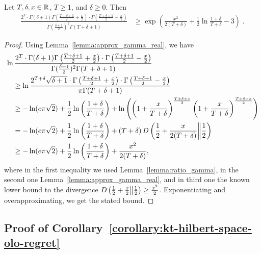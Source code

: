 \begin{lemma}
\label{lemma:lower_bound_gamma}
Let $T,\delta,x \in \mathbb{R}$, $T\geq1$, and $\delta\geq0$. Then
\begin{align*}
\frac{2^T \cdot \Gamma(\delta+1) \Gamma \left(\frac{T+\delta+1}{2} + \frac{x}{2} \right) \cdot \Gamma \left(\frac{T+\delta+1}{2} - \frac{x}{2} \right)}{ \Gamma(\frac{\delta+1}{2})^2 \Gamma(T+\delta+1)}
&\geq\exp\left(\frac{x^2}{2(T+\delta)} +\frac{1}{2} \ln \frac{1+\delta}{T+\delta} -3\right) \;.
\end{align*}
\end{lemma}
\begin{proof}
Using Lemma~\ref{lemma:approx_gamma_real}, we have
\begin{align*}
&\ln \frac{2^T \cdot \Gamma(\delta+1) \Gamma \left(\frac{T+\delta+1}{2} + \frac{x}{2} \right) \cdot \Gamma \left(\frac{T+\delta+1}{2} - \frac{x}{2} \right)}{ \Gamma(\frac{\delta+1}{2})^2 \Gamma(T+\delta+1)} \\
&\quad \geq \ln \frac{2^{T+\delta} \sqrt{\delta+1} \cdot \Gamma \left(\frac{T+\delta+1}{2} + \frac{x}{2} \right) \cdot \Gamma \left(\frac{T+\delta+1}{2} - \frac{x}{2} \right)}{ \pi \Gamma(T+\delta+1)} \\
&\quad \geq -\ln(e \pi \sqrt{2}) +\frac{1}{2} \ln\left(\frac{1+\delta}{T+\delta}\right) +\ln \left(\left( 1+\frac{x}{T+\delta} \right)^\frac{T+\delta+x}{2} \left( 1+\frac{x}{T+\delta} \right)^\frac{T+\delta-x}{2}\right) \\
&\quad = -\ln(e \pi \sqrt{2}) +\frac{1}{2} \ln\left(\frac{1+\delta}{T+\delta}\right)+ (T+\delta) \, D\left({\frac{1}{2}+\frac{x}{2(T+\delta)}}\middle\|{\frac{1}{2}}\right) \\
&\quad \geq -\ln(e \pi \sqrt{2}) +\frac{1}{2} \ln\left(\frac{1+\delta}{T+\delta}\right)+ \frac{x^2}{2(T+\delta)} ,
\end{align*}
where in the first inequality we used Lemma~\ref{lemma:ratio_gamma}, in the second one Lemma~\ref{lemma:approx_gamma_real}, and in third one the known lower bound to the divergence $D\left({\frac{1}{2}+\frac{x}{2}}\middle\|{\frac{1}{2}}\right) \geq \frac{x^2}{2}$. Exponentiating and overapproximating, we get the stated bound.
\end{proof}


\subsection{Proof of Corollary~\ref{corollary:kt-hilbert-space-olo-regret}}

